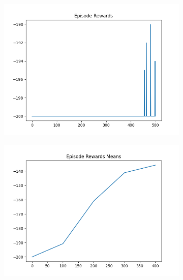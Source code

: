 \begin{figure}[H]
\begin{subfigure}{.47\linewidth}
        \includegraphics[width=\textwidth]{mountain/2024-06-15_12-31-16_dqn_mountaincar_episode_rewards.png}
    \end{subfigure}
    \begin{subfigure}{.47\linewidth}
        \centering
        \includegraphics[width=\textwidth]{mountain/2024-06-15_13-00-05_dqn_mountaincar_episode_rewards_means.png}
    \end{subfigure}
\end{figure}
